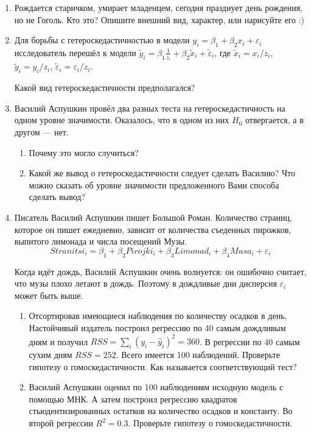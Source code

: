 \documentclass[12pt, a4paper]{article}\usepackage[]{graphicx}\usepackage[]{color}
\begin{document}
\begin{enumerate}

\item Рождается старичком, умирает младенцем, сегодня празднует день рождения, но не Гоголь.
Кто это? Опишите внешний вид, характер, или нарисуйте его :)

\item Для борьбы с гетероскедастичностью в модели $y_i=\beta_1+\beta_2 x_i+\varepsilon_i$ исследователь перешёл к модели $\tilde{y}_i=\beta_1 \frac{1}{z_i}+\beta_2 \tilde{x}_i+\tilde{\varepsilon}_i$, где $\tilde{x}_i=x_i/z_i$, $\tilde{y}_i=y_i/z_i$, $\tilde{\varepsilon}_i=\varepsilon_i/z_i$.

Какой вид гетероскедастичности предполагался?

\item Василий Аспушкин провёл два разных теста на гетероскедастичность на одном уровне значимости. Оказалось, что в одном из них $H_0$ отвергается, а в другом — нет.
\begin{enumerate}
\item Почему это могло случиться?
\item Какой же вывод о гетероскедастичности следует сделать Василию? Что можно сказать об уровне значимости предложенного Вами способа сделать вывод?

\end{enumerate}


\item Писатель Василий Аспушкин пишет Большой Роман. Количество страниц, которое он пишет ежедневно, зависит от количества съеденных пирожков, выпитого лимонада и числа посещений Музы.
\[
Stranitsi_i = \beta_1 + \beta_2 Pirojki_i + \beta_3 Limonad_i + \beta_4 Musa_i + \varepsilon_i
\]

Когда идёт дождь, Василий Аспушкин очень волнуется: он ошибочно считает, что музы плохо летают в дождь. Поэтому в дождливые дни дисперсия $\varepsilon_i$ может быть выше.


\begin{enumerate}
\item Отсортировав имеющиеся наблюдения по количеству осадков в день, Настойчивый издатель построил регрессию по 40 самым дождливым дням и получил $RSS=\sum_i (y_i-\hat{y}_i)^2=360$. В регрессии по 40 самым сухим дням $RSS=252$. Всего имеется 100 наблюдений. Проверьте гипотезу о гомоскедастичности. Как называется соответствующий тест?

\item Василий Аспушкин оценил по 100 наблюдениям исходную модель с помощью МНК. А затем построил регрессию квадратов стьюдентизированных остатков на количество осадков и константу. Во второй регрессии $R^2=0.3$. Проверьте гипотезу о гомоскедастичности.


\end{enumerate}
\end{enumerate}
\end{document}
